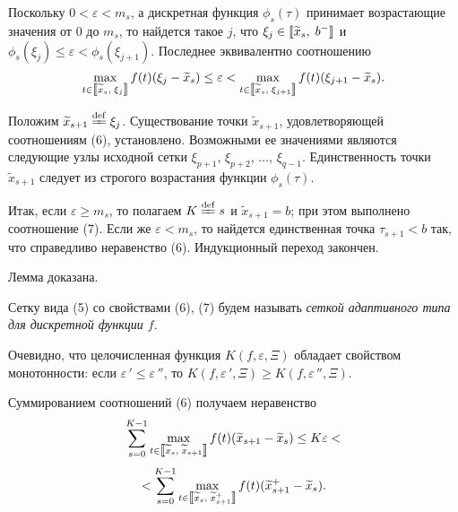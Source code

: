 \documentclass{spisok-article}
\newcommand{\defabove}{\stackrel{\rm def}{=\kern-3.6pt=}}
\begin{document}
    Поскольку $0<\varepsilon<m_s$, а дискретная функция $\phi_s(\tau)$ принимает
    возрастающие значения от $0$   до $m_s$, то найдется такое
    $j$,  что $\xi_j\in\hbox{\rm\textlbrackdbl}\widetilde x_s,\;
      b^-\hbox{\rm\textrbrackdbl}$ и $\phi_s(\xi_j)\leq
      \varepsilon<\phi_s(\xi_{j+1})$. Последнее эквивалентно
      соотношению
        $$\max_{t\in\hbox{\rm\textlbrackdbl}\widetilde x_s,\;
        \xi_j\hbox{\rm\textrbrackdbl}} f(t)
    (\xi_j-\widetilde x_s)\leq\varepsilon
    <\max_{t\in\hbox{\rm\textlbrackdbl}\widetilde x_s,\;
        \xi_{j+1}\hbox{\rm\textrbrackdbl}} f(t)
    (\xi_{j+1}-\widetilde x_s).
    $$

    Положим $\widetilde x_{s+1}\defabove\xi_j$.
    Существование  точки  $\widetilde x_{s+1}$,
    удовлетворяющей соотношениям (6),
    установлено. Возможными ее значениями являются
    следующие узлы исходной сетки $\xi_{p+1}$, $\xi_{p+2}$,
    $\dots$,  $\xi_{q-1}$.  Единственность точки
     $\widetilde x_{s+1}$ следует из строгого возрастания функции
   $\phi_s(\tau)$.

      Итак, если $\varepsilon\geq m_s$, то
    полагаем $K\defabove s$ и $\widetilde x_{s+1}=b$; при этом
    выполнено соотношение (7).
      Если же $\varepsilon<m_s$, то найдется единственная точка
   $\tau_{s+1}<b$ так, что справедливо неравенство (6).
    Индукционный переход закончен.

    Лемма доказана.

      Сетку вида (5) со свойствами (6), (7) будем называть {\it сеткой
   адаптивного типа для дискретной функции $f$}.

    Очевидно, что целочисленная функция  $K(f,\varepsilon,\Xi)$ обладает
    свойством монотонности: если $\varepsilon\,'\leq\varepsilon\,''$,  то
   $K(f,\varepsilon\,',\Xi)\geq K(f,\varepsilon\,'',\Xi)$.

    Суммированием соотношений (6) получаем неравенство
      $$\sum_{s=0}^{K-1}\max_{t\in\hbox{\rm\textlbrackdbl}\widetilde x_s,\;
        \widetilde x_{s+1}\hbox{\rm\textrbrackdbl}} f(t)
    (\widetilde x_{s+1}-\widetilde x_s)\leq K\varepsilon<$$$$<
\sum_{s=0}^{K-1}\max_{t\in\hbox{\rm\textlbrackdbl}\widetilde x_s,\;
        \widetilde x^+_{s+1}\hbox{\rm\textrbrackdbl}} f(t)
    (\widetilde x^+_{s+1}-\widetilde x_s).
    $$
\end{document}
